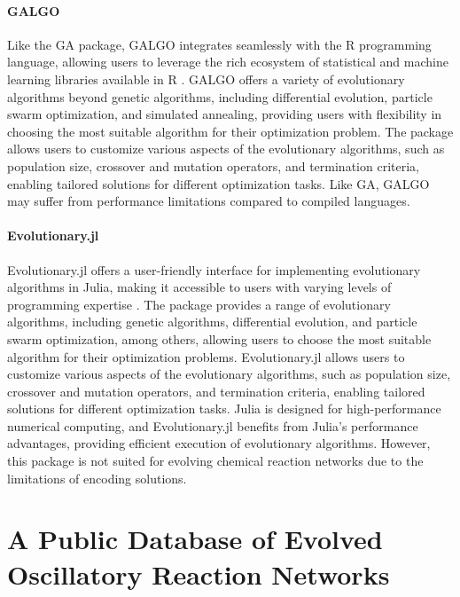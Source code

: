 \documentclass[12pt]{report}
\begin{document}
\subsubsection{GALGO}

Like the GA package, GALGO integrates seamlessly with the R programming language, allowing users to leverage the rich ecosystem of statistical and machine learning libraries available in R \cite{Trevino2006}. GALGO offers a variety of evolutionary algorithms beyond genetic algorithms, including differential evolution, particle swarm optimization, and simulated annealing, providing users with flexibility in choosing the most suitable algorithm for their optimization problem. The package allows users to customize various aspects of the evolutionary algorithms, such as population size, crossover and mutation operators, and termination criteria, enabling tailored solutions for different optimization tasks. Like GA, GALGO may suffer from performance limitations compared to compiled languages.

\subsubsection{Evolutionary.jl}
Evolutionary.jl offers a user-friendly interface for implementing evolutionary algorithms in Julia, making it accessible to users with varying levels of programming expertise \cite{evolutionary.jl}. The package provides a range of evolutionary algorithms, including genetic algorithms, differential evolution, and particle swarm optimization, among others, allowing users to choose the most suitable algorithm for their optimization problems. Evolutionary.jl allows users to customize various aspects of the evolutionary algorithms, such as population size, crossover and mutation operators, and termination criteria, enabling tailored solutions for different optimization tasks. Julia is designed for high-performance numerical computing, and Evolutionary.jl benefits from Julia's performance advantages, providing efficient execution of evolutionary algorithms. However, this package is not suited for evolving chemical reaction networks due to the limitations of encoding solutions.


\chapter{A Public Database of Evolved Oscillatory Reaction Networks}
\label{chap: cesium_paper}
\end{document}
